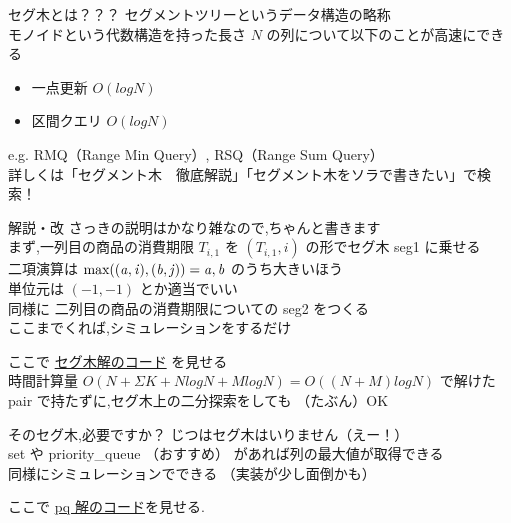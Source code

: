 \documentclass[dvipdfmx,12pt]{beamer}%
\begin{document}
\begin{frame}{セグ木とは？？？}
セグメントツリーというデータ構造の略称 \\
モノイドという代数構造を持った長さ $N$ の列について以下のことが高速にできる \\
\begin{itemize}
	\item 一点更新 $ O(log N) $
	\item 区間クエリ $ O(log N)$
\end{itemize}
e.g. RMQ（Range Min Query）, RSQ（Range Sum Query） \\
詳しくは「セグメント木　徹底解説」「セグメント木をソラで書きたい」で検索！\\

\end{frame}

\begin{frame}{解説・改}
さっきの説明はかなり雑なので,ちゃんと書きます\\
まず,一列目の商品の消費期限 $ T_{i,1} $ を $ (T_{i, 1}, i)$ の形でセグ木 seg1 に乗せる\\
二項演算は $ \rm{}max \it ((a, i), (b, j)) = a, b$ のうち大きいほう \\
単位元は $ (-1, -1) $ とか適当でいい\\
同様に 二列目の商品の消費期限についての seg2 をつくる \\
ここまでくれば,シミュレーションをするだけ\\
\end{frame}


\begin{frame}
ここで \href{https://atcoder.jp/contests/past202005-open/submissions/14175896 \\}{セグ木解のコード} を見せる\\
時間計算量 $ O(N + \Sigma K + N log N + M log N ) = O((N + M) log N)$ で解けた \\
pair で持たずに,セグ木上の二分探索をしても （たぶん）OK
\end{frame}


\begin{frame}{そのセグ木,必要ですか？}
じつはセグ木はいりません（えー！）\\
set や priority\_queue （おすすめ） があれば列の最大値が取得できる \\
同様にシミュレーションでできる （実装が少し面倒かも）\\
\end{frame}

\begin{frame}
ここで \href{https://atcoder.jp/contests/past202005-open/submissions/14155701}{pq 解のコード}を見せる.\\
\end{frame}
%
%
\end{document}
